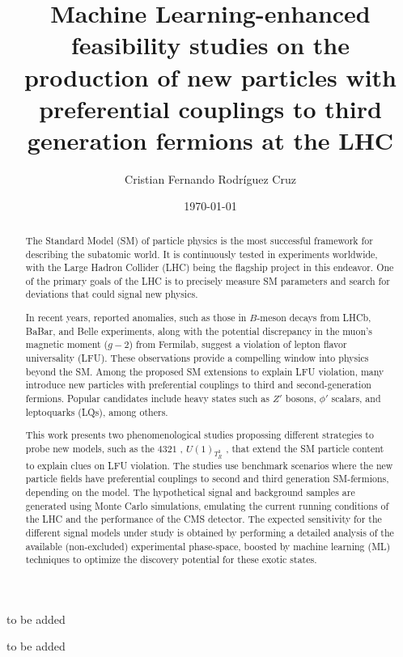 \documentclass[11pt, letterpaper]{book}%
\title{Machine Learning-enhanced feasibility studies on the production of new particles with preferential couplings to third generation fermions at the LHC}
\author{Cristian Fernando Rodríguez Cruz}
\date{\today}
\begin{document}
\frontmatter

\maketitle

\begin{dedication}
to be added
\end{dedication}

\begin{acknowledgements}
to be added
\end{acknowledgements}

\begin{abstract}
The Standard Model (SM) of particle physics is the most successful framework for describing the subatomic world. It is continuously tested in experiments worldwide, with the Large Hadron Collider (LHC) being the flagship project in this endeavor. One of the primary goals of the LHC is to precisely measure SM parameters and search for deviations that could signal new physics.  

In recent years, reported anomalies, such as those in $B$-meson decays from LHCb, BaBar, and Belle experiments, along with the potential discrepancy in the muon's magnetic moment ($g-2$) from Fermilab, suggest a violation of lepton flavor universality (LFU). These observations provide a compelling window into physics beyond the SM. Among the proposed SM extensions to explain LFU violation, many introduce new particles with preferential couplings to third and second-generation fermions. Popular candidates include heavy states such as $Z'$ bosons, $\phi'$ scalars, and leptoquarks (LQs), among others.

This work presents two phenomenological studies propossing different strategies to probe new models, such as the $4321$ \cite{Florez2023}, $U(1)_{T^3_R}$ \cite{Qureshi:2024naw}, that extend the SM particle content to explain clues on LFU violation. The studies use benchmark scenarios where the new particle fields have preferential couplings to second and third generation SM-fermions, depending on the model. The hypothetical signal and background samples are generated using Monte Carlo simulations, emulating the current running conditions of the LHC and the performance of the CMS detector. The expected sensitivity for the different signal models under study is obtained by performing a detailed analysis of the available (non-excluded) experimental phase-space, boosted by  machine learning (ML) techniques to optimize the discovery potential for these exotic states.
\end{abstract}
\end{document}
